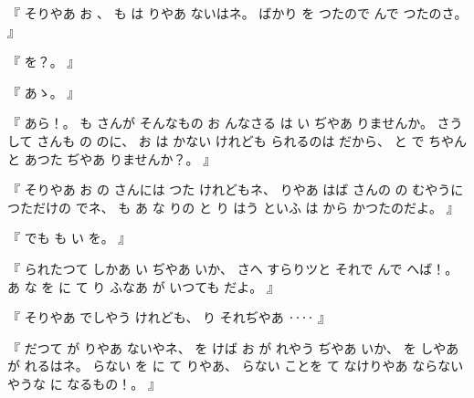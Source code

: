 %
『
そりやあ
お
、
%
も
は
りやあ
ないはネ。
%
ばかり
を
つたので
んで
つたのさ。
』

%
『
を？。
』


%
『
あゝ。
』

%
『
あら！。
%
も
さんが
そんなもの
お
んなさる
は
い
ぢやあ
りませんか。
%
さうして
さんも
の
のに、
%
お
は
かない
けれども
られるのは
だから、
%
と
で
ちやんと
あつた
ぢやあ
りませんか？。
』

%
『
そりやあ
お
の
さんには
つた
けれどもネ、
%
りやあ
はば
さんの
の
むやうに
つただけの%
でネ、
%
も
あ
な
りの
と
り
はう
といふ
は
から
かつたのだよ。
』

%
『
でも
も
い
を。
』

%
『
られたつて
しかあ
い
ぢやあ
いか、
%
さへ
すらりツと
それで
んで
へば！。
%
あ
な
を
に
て
り
ふなあ
が
いつても
だよ。
』

%
『
そりやあ
でしやう
けれども、
%
り
それぢやあ
‥‥
』

%
『
だつて
が
りやあ
ないやネ、
%
を
けば
お
が
れやう
ぢやあ
いか、
%
を
しやあ
が
れるはネ。
%
らない
を
に
て
りやあ、
%
らない
ことを
て
なけりやあ
ならない
やうな
に
なるもの！。
』

